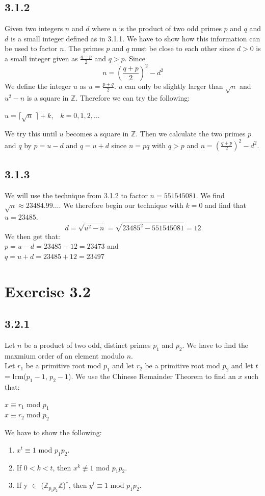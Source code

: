 \documentclass[11pt]{report}
\begin{document}
\subsection*{3.1.2}
Given two integers $n$ and $d$ where $n$ is the product of two odd primes $p$ and $q$ and $d$ is a small integer defined as in 3.1.1. We have to show how this information can be used to factor $n$. The primes $p$ and $q$ must be close to each other since $d > 0$ is a small integer given as $\frac{q-p}{2}$ and $q > p$. Since
$$n = (\frac{q + p}{2})^2 - d^2$$
We define the integer $u$ as $u = \frac{p+q}{2}$. $u$ can only be slightly larger than $\sqrt{n}$ and $u^2 - n$ is a square in $\mathbb{Z}$. Therefore we can try the following:
\begin{center}
$u = \lceil \sqrt{n}$ $\rceil + k$, ${}$ ${}$ $k =0,1,2,\dots$
\end{center}
We try this until $u$ becomes a square in $\mathbb{Z}$. Then we calculate the two primes $p$ and $q$ by $p = u - d$ and $q = u + d$ since $n = pq$ with $q > p$ and $n = (\frac{q + p}{2})^2 - d^2$.


\subsection*{3.1.3}
We will use the technique from 3.1.2 to factor $n = 551545081$. We find $\sqrt{n} \approx 23484.99\dots$. We therefore begin our technique with $k = 0$ and find that $u = 23485$.
$$d = \sqrt{u^2 - n} = \sqrt{23485^2 - 551545081} = 12$$
We then get that:\\
$p = u - d = 23485 - 12 = 23473$ and\\
$q = u + d = 23485 + 12 = 23497$\\

\section*{Exercise 3.2}
\subsection*{3.2.1}
Let $n$ be a product of two odd, distinct primes $p_1$ and $p_2$. We have to find the maxmium order of an element modulo $n$.\\
Let $r_1$ be a primitive root mod $p_1$ and let $r_2$ be a primitive root mod $p_2$ and let $t$ = lcm($p_1 -1$, $p_2 - 1$). We use the Chinese Remainder Theorem to find an $x$ such that:
\begin{center}
$x \equiv r_1$ mod $p_1$\\
$x \equiv r_2$ mod $p_2$
\end{center}
We have to show the following:
\begin{enumerate}
\item $x^t \equiv 1$ mod $p_1p_2$.
\item If $0 < k < t$, then $x^k \not\equiv 1$ mod $p_1p_2$.
\item If y $\in$ ($\mathbb{Z}_{p_1p_2}\mathbb{Z}$)$^*$, then $y^t \equiv 1$ mod $p_1p_2$.
\end{enumerate}
\end{document}
